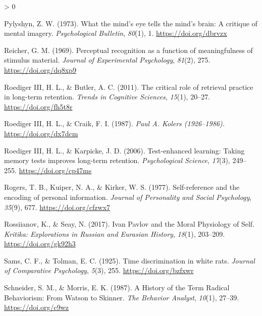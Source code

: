 \documentclass[
  oneside,
  12pt]{crumpbook}
\newlength{\cslhangindent}
\newenvironment{CSLReferences}[2] %
 {%
  \setlength{\parindent}{0pt}
  \ifodd #1 \everypar{\setlength{\hangindent}{\cslhangindent}}\ignorespaces\fi
  \ifnum #2 > 0
  \setlength{\parskip}{#2\baselineskip}
  \fi
 }%
 {}
\begin{document}
\begin{CSLReferences}{1}{0}
\leavevmode\hypertarget{ref-pylyshynWhatMindEye1973}{}%
Pylyshyn, Z. W. (1973). What the mind's eye tells the mind's brain: {A} critique of mental imagery. \emph{Psychological Bulletin}, \emph{80}(1), 1. \url{https://doi.org/dbrvzx}

\leavevmode\hypertarget{ref-reicherPerceptualRecognitionFunction1969}{}%
Reicher, G. M. (1969). Perceptual recognition as a function of meaningfulness of stimulus material. \emph{Journal of Experimental Psychology}, \emph{81}(2), 275. \url{https://doi.org/dq8xp9}

\leavevmode\hypertarget{ref-roedigeriiiCriticalRoleRetrieval2011}{}%
Roediger III, H. L., \& Butler, A. C. (2011). The critical role of retrieval practice in long-term retention. \emph{Trends in Cognitive Sciences}, \emph{15}(1), 20--27. \url{https://doi.org/fh5t8r}

\leavevmode\hypertarget{ref-roedigeriiiPaulKolers19261987}{}%
Roediger III, H. L., \& Craik, F. I. (1987). \emph{Paul {A}. {Kolers} (1926--1986).} \url{https://doi.org/dx7dcm}

\leavevmode\hypertarget{ref-roedigeriiiTestenhancedLearningTaking2006}{}%
Roediger III, H. L., \& Karpicke, J. D. (2006). Test-enhanced learning: {Taking} memory tests improves long-term retention. \emph{Psychological Science}, \emph{17}(3), 249--255. \url{https://doi.org/cp47ms}

\leavevmode\hypertarget{ref-rogersSelfreferenceEncodingPersonal1977}{}%
Rogers, T. B., Kuiper, N. A., \& Kirker, W. S. (1977). Self-reference and the encoding of personal information. \emph{Journal of Personality and Social Psychology}, \emph{35}(9), 677. \url{https://doi.org/cfzwx7}

\leavevmode\hypertarget{ref-rossiianovIvanPavlovMoral2017}{}%
Rossiianov, K., \& Seay, N. (2017). Ivan {Pavlov} and the {Moral Physiology} of {Self}. \emph{Kritika: Explorations in Russian and Eurasian History}, \emph{18}(1), 203--209. \url{https://doi.org/gk92h3}

\leavevmode\hypertarget{ref-samsTimeDiscriminationWhite1925}{}%
Sams, C. F., \& Tolman, E. C. (1925). Time discrimination in white rats. \emph{Journal of Comparative Psychology}, \emph{5}(3), 255. \url{https://doi.org/bzfxwr}

\leavevmode\hypertarget{ref-schneiderHistoryTermRadical1987}{}%
Schneider, S. M., \& Morris, E. K. (1987). A {History} of the {Term Radical Behaviorism}: {From Watson} to {Skinner}. \emph{The Behavior Analyst}, \emph{10}(1), 27--39. \url{https://doi.org/c9wz}


\end{CSLReferences}
\end{document}
